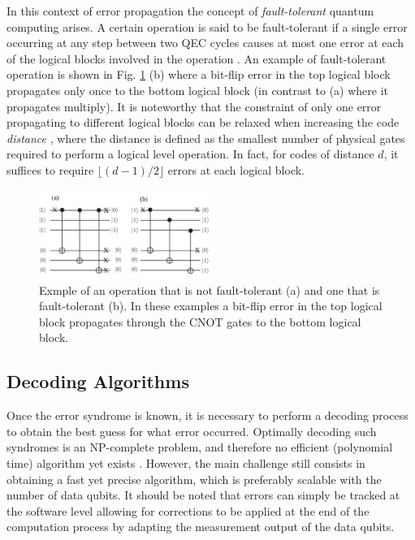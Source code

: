 In this context of error propagation the concept of \textit{fault-tolerant}
quantum computing arises. A certain operation is said to be fault-tolerant if a
single error occurring at any step between two QEC cycles causes at most one
error at each of the logical blocks involved in the operation
\cite{Devitt_2013}. An example of fault-tolerant operation is shown in Fig.
\ref{fig:fault_tol} (b) where a bit-flip error in the top logical block
propagates only once to the bottom logical block (in contrast to (a) where it
propagates multiply). It is noteworthy that the constraint of only one error
propagating to different logical blocks can be relaxed when increasing the code
\textit{distance} \cite{Devitt_2013}, where the distance is defined as the
smallest number of physical gates required to perform a logical level operation.
In fact, for codes of distance $d$, it suffices to require $\lfloor{(d-1)/2}
\rfloor$ errors at each logical block.

\begin{figure}[htbp]
  \centering
  \includegraphics[width=0.5\textwidth]{images/fault_tolerance.pdf}
  \caption{Exmple of an operation that is not fault-tolerant (a) and one that is
    fault-tolerant (b). In these examples a bit-flip error in the top logical
    block propagates through the CNOT gates to the bottom logical block.}
  \label{fig:fault_tol}
\end{figure}

\subsection{Decoding Algorithms}
Once the error syndrome is known, it is necessary to perform a decoding process
to obtain the best guess for what error occurred. Optimally decoding such
syndromes is an NP-complete problem, and therefore no efficient (polynomial
time) algorithm yet exists \cite{Berlekamp}. However, the main challenge still
consists in obtaining a fast yet precise algorithm, which is preferably scalable
with the number of data qubits. It should be noted that errors can simply be
tracked at the software level allowing for corrections to be applied at the end
of the computation process by adapting the measurement output of the data
qubits.

